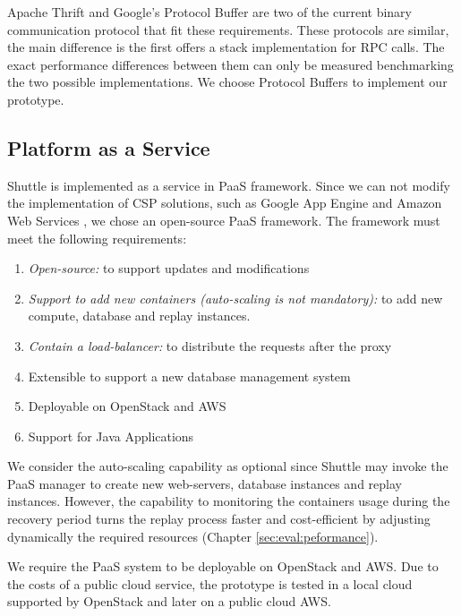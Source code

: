 Apache Thrift \cite{Thrift} and Google's Protocol Buffer \cite{protobuffers} are two of the current binary communication protocol that fit these requirements. These protocols are similar, the main difference is the first offers a stack implementation for \acf{RPC} calls. The exact performance differences between them can only be measured benchmarking the two possible implementations. We choose Protocol Buffers to implement our prototype.



\subsection{Platform as a Service}\label{sec:impl:paas}
Shuttle is implemented as a service in \ac{PaaS} framework. Since we can not modify the implementation of \acf{CSP} solutions, such as Google App Engine \cite{GoogleAppEngine} and Amazon Web Services \cite{AmazonElasticBeanstalk}, we chose an open-source \ac{PaaS} framework. The framework must meet the following requirements: 

\begin{enumerate}
	\item \textit{Open-source:} to support updates and modifications
	\item \textit{Support to add new containers (auto-scaling is not mandatory):} to add new compute, database and replay instances.
	\item \textit{Contain a load-balancer:} to distribute the requests after the proxy
	\item Extensible to support a new database management system
	\item Deployable on OpenStack and \acf{AWS}
	\item Support for Java Applications
\end{enumerate}

We consider the auto-scaling capability as optional since Shuttle may invoke the \ac{PaaS} manager to create new web-servers, database instances and replay instances. However, the capability to monitoring the containers usage during the recovery period turns the replay process faster and cost-efficient by adjusting dynamically the required resources (Chapter \ref{sec:eval:peformance}). 

We require the \ac{PaaS} system to be deployable on OpenStack \cite{openstack} and \acf{AWS}. Due to the costs of a public cloud service, the prototype is tested in a local cloud supported by OpenStack and later on a public cloud \ac{AWS}.

